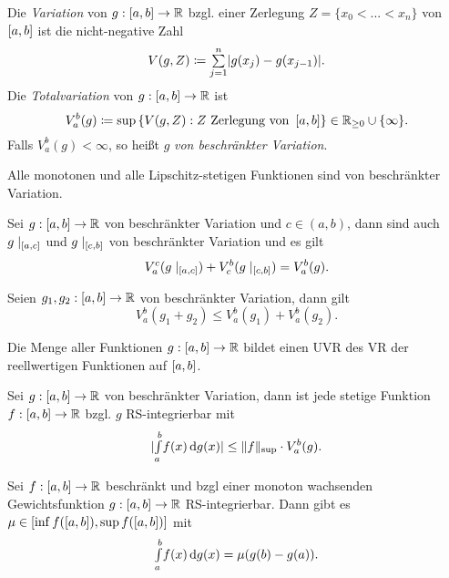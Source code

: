 \documentclass{cheat-sheet}
\begin{document}
\begin{defn}
  Die \emph{Variation} von $g : \left[ a, b \right] \to \mathbb{R}$ bzgl. einer Zerlegung $Z = \{ x_0 < ... < x_n \}$ von $\left[ a, b \right]$ ist die nicht-negative Zahl
  \[ V(g, Z) \coloneqq \sum_{j=1}^{n} \abs{g(x_j) - g(x_{j-1})}. \]
  Die \emph{Totalvariation} von $g : \left[ a, b \right] \to \mathbb{R}$ ist
  \[ V_a^b(g) \coloneqq \sup\left\{ V(g, Z) : Z \text{ Zerlegung von } \left[ a, b \right] \right\} \in \mathbb{R}_{\ge 0} \cup \{ \infty \}. \]
  Falls $V_a^b(g) < \infty$, so heißt $g$ \emph{von beschränkter Variation}.
\end{defn}

\begin{satz}
  Alle monotonen und alle Lipschitz-stetigen Funktionen sind von beschränkter Variation.
\end{satz}

\begin{satz}
  Sei $g : \left[ a, b \right] \to \mathbb{R}$ von beschränkter Variation und $c \in (a, b)$, dann sind auch $g\mid_{\left[ a, c \right]}$ und $g\mid_{\left[ c, b \right]}$ von beschränkter Variation und es gilt
  \[ V_a^c(g\mid_{\left[ a, c \right]}) + V_c^b(g\mid_{\left[ c, b \right]}) = V_a^b(g). \]
\end{satz}

\begin{satz}
  Seien $g_1, g_2 : \left[ a, b \right] \to \mathbb{R}$ von beschränkter Variation, dann gilt
  \[ V_a^b(g_1 + g_2) \le V_a^b(g_1) + V_a^b(g_2). \]
\end{satz}

\begin{satz}
  Die Menge aller Funktionen $g : \left[ a, b \right] \to \mathbb{R}$ bildet einen UVR des VR der reellwertigen Funktionen auf $\left[ a, b \right]$.
\end{satz}

\begin{satz}
  Sei $g : \left[ a, b \right] \to \mathbb{R}$ von beschränkter Variation, dann ist jede stetige Funktion $f : \left[ a, b \right] \to \mathbb{R}$ bzgl. $g$ RS-integrierbar mit
  \[ \lvert{\textstyle \int\limits_{a}^{b}} f(x) \,\mathrm{d} g(x)\rvert \le \lVert f\rVert_{\sup} \cdot V_a^b(g). \]
\end{satz}

\begin{satz}
  Sei $f : \left[ a, b \right] \to \mathbb{R}$ beschränkt und bzgl einer monoton wachsenden Gewichtsfunktion $g : \left[ a, b \right] \to \mathbb{R}$ RS-integrierbar. Dann gibt es $\mu \in \left[ \inf f(\left[ a, b \right]), \sup f(\left[ a, b \right]) \right]$ mit
  \[ {\textstyle \int\limits_{a}^{b}} f(x) \,\mathrm{d} g(x) = \mu(g(b) - g(a)). \]
\end{satz}
\end{document}
